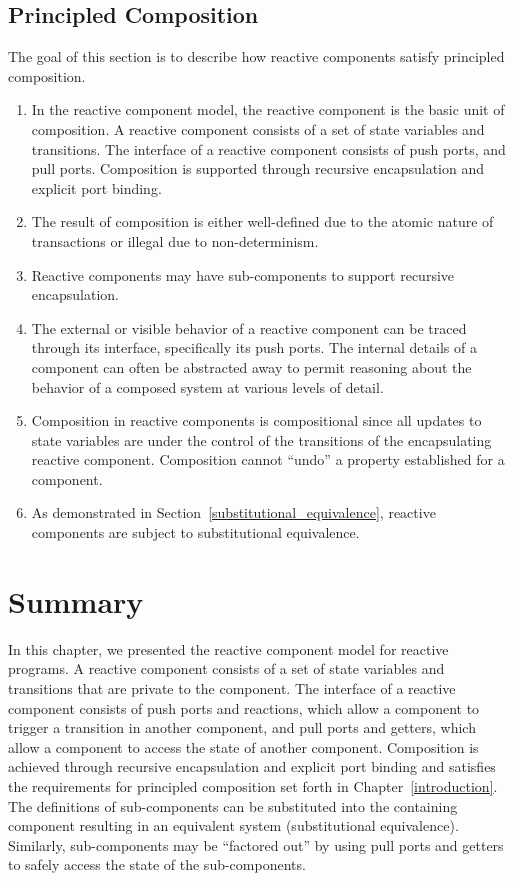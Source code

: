 \subsection{Principled Composition}
The goal of this section is to describe how reactive components satisfy principled composition.
\begin{enumerate}
\item In the reactive component model, the reactive component is the basic unit of composition.
A reactive component consists of a set of state variables and transitions.
The interface of a reactive component consists of push ports, and pull ports.
Composition is supported through recursive encapsulation and explicit port binding.

\item The result of composition is either well-defined due to the atomic nature of transactions or illegal due to non-determinism.

\item Reactive components may have sub-components to support recursive encapsulation.

\item The external or visible behavior of a reactive component can be traced through its interface, specifically its push ports.
The internal details of a component can often be abstracted away to permit reasoning about the behavior of a composed system at various levels of detail.

\item Composition in reactive components is compositional since all updates to state variables are under the control of the transitions of the encapsulating reactive component.
Composition cannot ``undo'' a property established for a component.

\item As demonstrated in Section~\ref{substitutional_equivalence}, reactive components are subject to substitutional equivalence.
\end{enumerate}

\section{Summary}
In this chapter, we presented the reactive component model for reactive programs.
A reactive component consists of a set of state variables and transitions that are private to the component.
The interface of a reactive component consists of push ports and reactions, which allow a component to trigger a transition in another component, and pull ports and getters, which allow a component to access the state of another component.
Composition is achieved through recursive encapsulation and explicit port binding and satisfies the requirements for principled composition set forth in Chapter~\ref{introduction}.
The definitions of sub-components can be substituted into the containing component resulting in an equivalent system (substitutional equivalence).
Similarly, sub-components may be ``factored out'' by using pull ports and getters to safely access the state of the sub-components.

